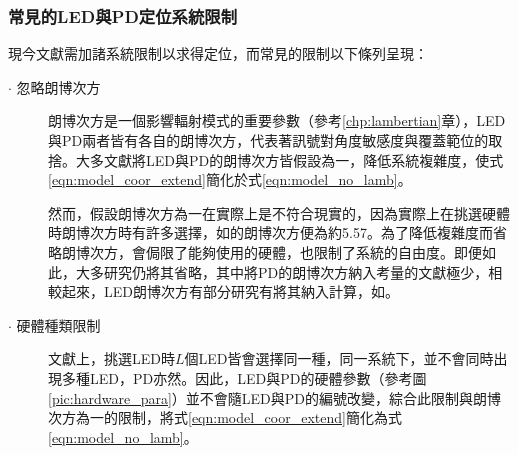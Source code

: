         


        \subsubsection{常見的LED與PD定位系統限制}
        \label{chp:LEDPD_restrict}

        現今文獻需加諸系統限制以求得定位，而常見的限制以下條列呈現：

        \begin{description}
            \item[$\cdot$ 忽略朗博次方] \hfill
            
            \qquad
            朗博次方是一個影響輻射模式的重要參數（參考\ref{chp:lambertian}章），LED與PD兩者皆有各自的朗博次方，代表著訊號對角度敏感度與覆蓋範位的取捨。大多文獻將LED與PD的朗博次方皆假設為一，降低系統複雜度，使式\ref{eqn:model_coor_extend}簡化於式\ref{eqn:model_no_lamb}。

            \qquad
            然而，假設朗博次方為一在實際上是不符合現實的，因為實際上在挑選硬體時朗博次方時有許多選擇，如\cite{datasheet:led_vsma}的朗博次方便為約5.57。為了降低複雜度而省略朗博次方，會侷限了能夠使用的硬體，也限制了系統的自由度\cite{survey_light2018}。即便如此，大多研究仍將其省略，其中將PD的朗博次方納入考量的文獻極少\cite{survey_light2018}，相較起來，LED朗博次方有部分研究有將其納入計算，如\cite{case:cart2d}\cite{case:cart3d}。
            
            

            \item[$\cdot$ 硬體種類限制]\hfill
            
            \qquad
            文獻上，挑選LED時$L$個LED皆會選擇同一種，同一系統下，並不會同時出現多種LED，PD亦然。因此，LED與PD的硬體參數（參考圖\ref{pic:hardware_para}）並不會隨LED與PD的編號改變，綜合此限制與朗博次方為一的限制，將式\ref{eqn:model_coor_extend}簡化為式\ref{eqn:model_no_lamb}。


\end{description}
